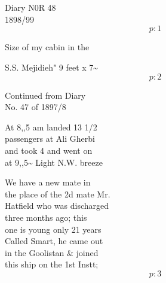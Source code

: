 \documentclass{report}
\begin{document}
\newcommand{\mnote}[1] {\marginpar{\scriptsize \raggedright #1 }}


	\chapter{}

	\marginpar{}

	\par{
 	
	}

	\par{
 	Diary N0R 48\ \\1898/99\ \\
  \[p: 1 \]

	}

	\par{
 	Size of my cabin in the\ \\
	}

	\par{
 	S.S. Mejidieh" 9 feet x 7\~{}\ \\
  \[p: 2 \]

	}



	\par{
 	Continued from Diary\ \\No. 47 of 1897/8\ \\
	}

	\par{
 	At 8,,5 am landed 13 1/2\ \\passengers at Ali Gherbi\ \\and took 4 and went on\ \\at 9,,5\~{} Light N.W. breeze\ \\
	}

	\par{
 	We have a new mate in\ \\the place of the 2d mate Mr.\ \\Hatfield who was discharged\ \\three months ago; this\ \\one is young only 21 years\ \\Called Smart, he came out\ \\in the Goolistan \& joined\ \\this ship on the 1st Instt;\ \\
  \[p: 3 \]

	}
\end{document}
